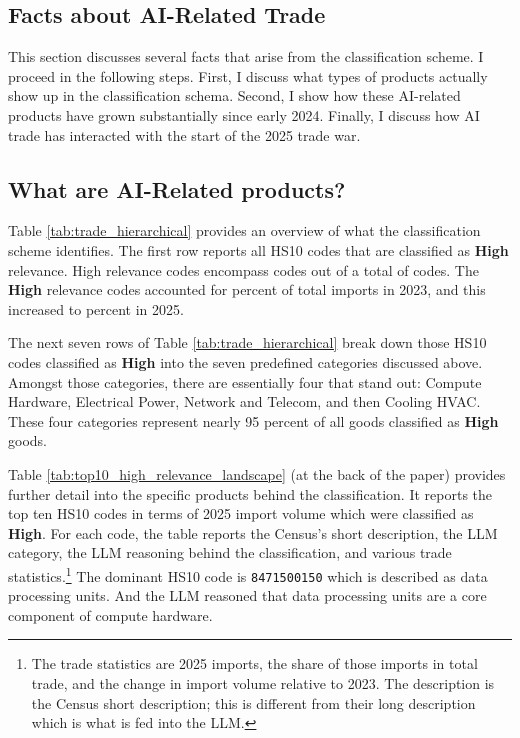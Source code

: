 \documentclass[12pt,pdftex]{article}
\begin{document}
\begin{onehalfspacing}
\afterpage{%
\clearpage

}

\section{Facts about AI-Related Trade}\label{sec:facts}

This section discusses several facts that arise from the classification scheme. I proceed in the following steps. First, I discuss what types of products actually show up in the classification schema. Second, I show how these AI-related products have grown substantially since early 2024. Finally, I discuss how AI trade has interacted with the start of the 2025 trade war. 

\subsection{What are AI-Related products?}\label{sec:facts-ai-products}

Table \ref{tab:trade_hierarchical} provides an overview of what the classification scheme identifies. The first row reports all HS10 codes that are classified as \textbf{High} relevance. High relevance codes encompass \totalHighAiHsCodes{} codes out of a total of \totalTradeHsCodes{} codes. The \textbf{High} relevance codes accounted for \aiShareTwentyThree{} percent of total imports in 2023, and this increased to \aiShareTwentyFive{} percent in 2025.

The next seven rows of Table \ref{tab:trade_hierarchical} break down those HS10 codes classified as \textbf{High} into the seven predefined categories discussed above. Amongst those categories, there are essentially four that stand out: Compute Hardware, Electrical Power, Network and Telecom, and then Cooling HVAC. These four categories represent nearly 95 percent of all goods classified as \textbf{High} goods.

Table \ref{tab:top10_high_relevance_landscape} (at the back of the paper) provides further detail into the specific products behind the classification. It reports the top ten HS10 codes in terms of 2025 import volume which were classified as \textbf{High}. For each code, the table reports the Census's short description, the LLM category, the LLM reasoning behind the classification, and various trade statistics.\footnote{The trade statistics are 2025 imports, the share of those imports in total trade, and the change in import volume relative to 2023. The description is the Census short description; this is different from their long description which is what is fed into the LLM.} The dominant HS10 code is {\tt 8471500150} which is described as data processing units. And the LLM reasoned that data processing units are a core component of compute hardware.


\end{onehalfspacing}
\end{document}
